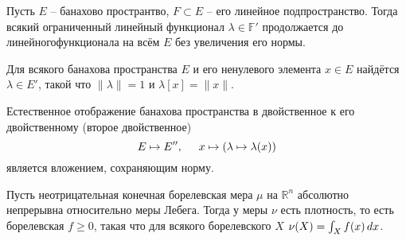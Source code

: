 



\begin{to_thr}
    Пусть $E$ -- банахово пространтво, $F \subset E$ -- его линейное подпространство. Тогда всякий ограниченный линейный функционал $\lambda \in \mathbb{F'}$ продолжается до линейногофункционала на всём $E$ без увеличения его нормы. 
\end{to_thr}

\begin{to_con}
    Для всякого банахова пространства $E$ и его ненулевого элемента $x \in E$ найдётся $\lambda \in E'$, такой что $\|\lambda\|=1$ и $\lambda[x] = \|x\|$.
\end{to_con}

\begin{to_con}
    Естественное отображение банахова пространства в двойственное к его двойственному (второе двойственное) 
    \begin{equation*}
        E \mapsto E'',
        \hspace{5 mm} 
        x \mapsto \left(\lambda \mapsto \lambda(x)\right)
    \end{equation*}
    является вложением, сохраняющим норму. 
\end{to_con}


\begin{to_thr}
    Пусть неотрицательная конечная борелевская мера $\mu$ на $\mathbb{R}^n$ абсолютно непрерывна относительно меры Лебега. Тогда у меры $\nu$ есть плотность, то есть борелевская $f \geq 0$, такая что для всякого борелевского $X$ $\nu(X) = \int_X f(x) \, d x$. 
\end{to_thr}






